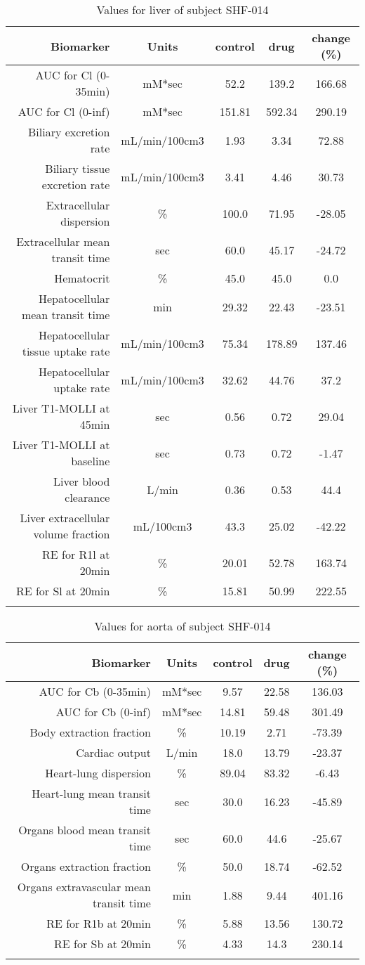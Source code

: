 \documentclass{epflreport}%
\begin{document}
%
\clearpage%
\begin{longtable}{rcccc}%
\hline%
Biomarker&Units&control&drug&change (\%)\\%
\hline%
AUC for Cl (0{-}35min)&mM*sec&52.2&139.2&166.68\\%
AUC for Cl (0{-}inf)&mM*sec&151.81&592.34&290.19\\%
Biliary excretion rate&mL/min/100cm3&1.93&3.34&72.88\\%
Biliary tissue excretion rate&mL/min/100cm3&3.41&4.46&30.73\\%
Extracellular dispersion&\%&100.0&71.95&{-}28.05\\%
Extracellular mean transit time&sec&60.0&45.17&{-}24.72\\%
Hematocrit&\%&45.0&45.0&0.0\\%
Hepatocellular mean transit time&min&29.32&22.43&{-}23.51\\%
Hepatocellular tissue uptake rate&mL/min/100cm3&75.34&178.89&137.46\\%
Hepatocellular uptake rate&mL/min/100cm3&32.62&44.76&37.2\\%
Liver T1{-}MOLLI at 45min&sec&0.56&0.72&29.04\\%
Liver T1{-}MOLLI at baseline&sec&0.73&0.72&{-}1.47\\%
Liver blood clearance&L/min&0.36&0.53&44.4\\%
Liver extracellular volume fraction&mL/100cm3&43.3&25.02&{-}42.22\\%
RE for R1l at 20min&\%&20.01&52.78&163.74\\%
RE for Sl at 20min&\%&15.81&50.99&222.55\\%
\hline%
\caption{Values for liver of subject SHF-014} \\%
\end{longtable}%
\begin{longtable}{rcccc}%
\hline%
Biomarker&Units&control&drug&change (\%)\\%
\hline%
AUC for Cb (0{-}35min)&mM*sec&9.57&22.58&136.03\\%
AUC for Cb (0{-}inf)&mM*sec&14.81&59.48&301.49\\%
Body extraction fraction&\%&10.19&2.71&{-}73.39\\%
Cardiac output&L/min&18.0&13.79&{-}23.37\\%
Heart{-}lung dispersion&\%&89.04&83.32&{-}6.43\\%
Heart{-}lung mean transit time&sec&30.0&16.23&{-}45.89\\%
Organs blood mean transit time&sec&60.0&44.6&{-}25.67\\%
Organs extraction fraction&\%&50.0&18.74&{-}62.52\\%
Organs extravascular mean transit time&min&1.88&9.44&401.16\\%
RE for R1b at 20min&\%&5.88&13.56&130.72\\%
RE for Sb at 20min&\%&4.33&14.3&230.14\\%
\hline%
\caption{Values for aorta of subject SHF-014} \\%
\end{longtable}%
\clearpage%
\end{document}
